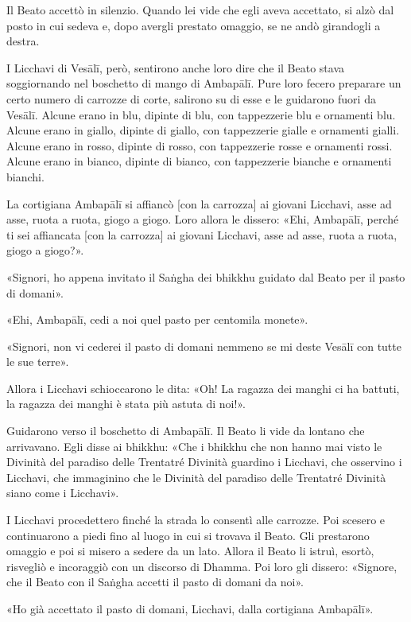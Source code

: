 Il Beato accettò in silenzio. Quando lei vide che egli aveva accettato, si alzò
dal posto in cui sedeva e, dopo avergli prestato omaggio, se ne andò girandogli
a destra.

I Licchavi di Vesālī, però, sentirono anche loro dire che il Beato stava
soggiornando nel boschetto di mango di Ambapālī. Pure loro fecero preparare un
certo numero di carrozze di corte, salirono su di esse e le guidarono fuori da
Vesālī. Alcune erano in blu, dipinte di blu, con tappezzerie blu e ornamenti
blu. Alcune erano in giallo, dipinte di giallo, con tappezzerie gialle e
ornamenti gialli. Alcune erano in rosso, dipinte di rosso, con tappezzerie rosse
e ornamenti rossi. Alcune erano in bianco, dipinte di bianco, con tappezzerie
bianche e ornamenti bianchi.

La cortigiana Ambapālī si affiancò [con la carrozza] ai giovani Licchavi, asse
ad asse, ruota a ruota, giogo a giogo. Loro allora le dissero: «Ehi, Ambapālī,
perché ti sei affiancata [con la carrozza] ai giovani Licchavi, asse ad asse,
ruota a ruota, giogo a giogo?».

«Signori, ho appena invitato il Saṅgha dei bhikkhu guidato dal Beato per il
pasto di domani».

«Ehi, Ambapālī, cedi a noi quel pasto per centomila monete».

«Signori, non vi cederei il pasto di domani nemmeno se mi deste Vesālī con tutte
le sue terre».

Allora i Licchavi schioccarono le dita: «Oh! La ragazza dei manghi ci ha
battuti, la ragazza dei manghi è stata più astuta di noi!».

Guidarono verso il boschetto di Ambapālī. Il Beato li vide da lontano che
arrivavano. Egli disse ai bhikkhu: «Che i bhikkhu che non hanno mai visto le
Divinità del paradiso delle Trentatré Divinità guardino i Licchavi, che
osservino i Licchavi, che immaginino che le Divinità del paradiso delle
Trentatré Divinità siano come i Licchavi».

I Licchavi procedettero finché la strada lo consentì alle carrozze. Poi scesero
e continuarono a piedi fino al luogo in cui si trovava il Beato. Gli prestarono
omaggio e poi si misero a sedere da un lato. Allora il Beato li istruì, esortò,
risvegliò e incoraggiò con un discorso di Dhamma. Poi loro gli dissero:
«Signore, che il Beato con il Saṅgha accetti il pasto di domani da noi».

«Ho già accettato il pasto di domani, Licchavi, dalla cortigiana Ambapālī».


